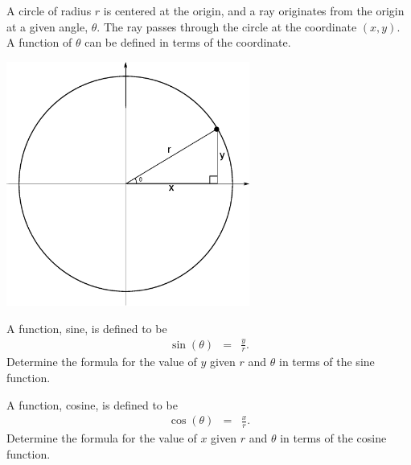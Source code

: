 
\begin{problem}
\item A circle of radius $r$ is centered at the origin, and a ray
  originates from the origin at a given angle, $\theta$. The ray
  passes through the circle at the coordinate $(x,y)$. A function of
  $\theta$ can be defined in terms of the coordinate.

  \includegraphics[width=8cm]{trig/img/circleTrig}

  \begin{subproblem}
  \item A function, sine, is defined to be
    \begin{eqnarray*}
      \sin(\theta) & = & \frac{y}{r}.
    \end{eqnarray*}
    Determine the formula for the value of $y$ given $r$ and $\theta$
    in terms of the sine function.
    \vfill
  \item A function, cosine, is defined to be
    \begin{eqnarray*}
      \cos(\theta) & = & \frac{x}{r}.
    \end{eqnarray*}
    Determine the formula for the value of $x$ given $r$ and $\theta$
    in terms of the cosine function.
    \vfill
  \end{subproblem}

\end{problem}


